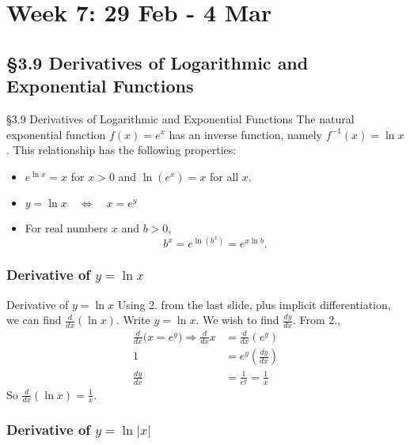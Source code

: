 \documentclass[cal1spr16Lectures.tex]{subfiles}
\begin{document}
\section[Week 7]{Week 7: 29 Feb - 4 Mar}

\subsection[3.9 Derivatives of Logarithmic and Exponential Functions]{\S 3.9 Derivatives of Logarithmic and Exponential Functions}

\begin{frame}{\S 3.9 Derivatives of Logarithmic and Exponential Functions}\footnotesize
The natural exponential function $f(x)=e^x$ has an inverse function, namely $f^{-1}(x)=\ln x$.  This relationship has the following properties:
\begin{itemize}
\item[1.] $e^{\ln x}=x $ for $x>0$ and $\ln(e^x)=x$ for all $x$.
\item[2.] $y=\ln x \quad\Longleftrightarrow\quad x=e^y$
\item[3.] For real numbers $x$ and $b>0$, 
\[b^x=e^{\ln (b^x)}=e^{x \ln b}.\]
\end{itemize}
\end{frame}

\subsubsection{Derivative of $y=\ln x$}

\begin{frame}{\small Derivative of $y=\ln x$}\footnotesize
Using 2. from the last slide, plus implicit differentiation, we can find $\textstyle\frac{d}{dx}\left(\ln x\right)$.  Write $y=\ln x$.  We wish to find $\textstyle\frac{dy}{dx}$.  From 2.,
\begin{align*}
\frac{d}{dx}\big(x=e^y\big) \Rightarrow \frac{d}{dx}x &= \frac{d}{dx}(e^y) \\[0.5pc]
1 &= e^y\left(\frac{dy}{dx}\right) \\[0.5pc]
\frac{dy}{dx} &= \frac{1}{e^y}=\frac{1}{x} 
\end{align*}
So \alert{$\frac{d}{dx}(\ln x)=\frac{1}{x}$}.
\end{frame}

\subsubsection{Derivative of $y=\ln{|x|}$}
\end{document}
